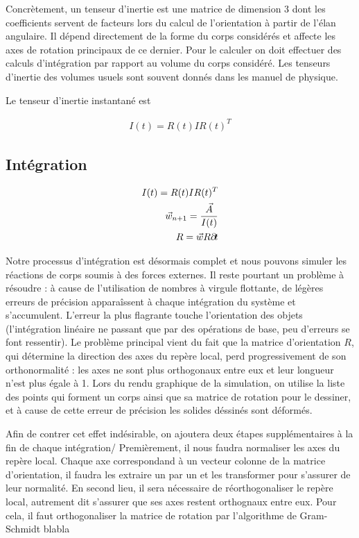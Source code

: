 Concrètement, un tenseur d'inertie est une matrice de dimension 3 dont
les coefficients servent de facteurs lors du calcul de l'orientation à
partir de l'élan angulaire. Il dépend directement de la forme du corps
considérés et affecte les axes de rotation principaux de ce
dernier. Pour le calculer on doit effectuer des calculs d'intégration
par rapport au volume du corps considéré. Les tenseurs d'inertie des
volumes usuels sont souvent donnés dans les manuel de physique.

Le tenseur d'inertie instantané est

\begin{align*}
  I(t) = R(t) I R(t)^T
\end{align*}

\subsection{Intégration}

\begin{align*}
  I(t) = R(t) I R(t)^T \\ \vec{w}_{n+1} = \frac{\vec{A}}{I(t)} \\ R =
  \vec{w} R \partial \! t
\end{align*}

Notre processus d'intégration est désormais complet et nous pouvons
simuler les réactions de corps soumis à des forces externes. Il reste
pourtant un problème à résoudre : à cause de l'utilisation de nombres
à virgule flottante, de légères erreurs de précision apparaîssent à
chaque intégration du système et s'accumulent. L'erreur la plus
flagrante touche l'orientation des objets (l'intégration linéaire ne
passant que par des opérations de base, peu d'erreurs se font
ressentir). Le problème principal vient du fait que la matrice
d'orientation $R$, qui détermine la direction des axes du repère
local, perd progressivement de son orthonormalité : les axes ne sont
plus orthogonaux entre eux et leur longueur n'est plus égale à 1. Lors
du rendu graphique de la simulation, on utilise la liste des points
qui forment un corps ainsi que sa matrice de rotation pour le
dessiner, et à cause de cette erreur de précision les solides déssinés
sont déformés.

Afin de contrer cet effet indésirable, on ajoutera deux étapes
supplémentaires à la fin de chaque intégration/ Premièrement, il nous
faudra normaliser les axes du repère local. Chaque axe correspondand à
un vecteur colonne de la matrice d'orientation, il faudra les extraire
un par un et les transformer pour s'assurer de leur normalité. En
second lieu, il sera nécessaire de réorthogonaliser le repère local,
autrement dit s'assurer que ses axes restent orthognaux entre
eux. Pour cela, il faut orthogonaliser la matrice de rotation par
l'algorithme de Gram-Schmidt blabla
